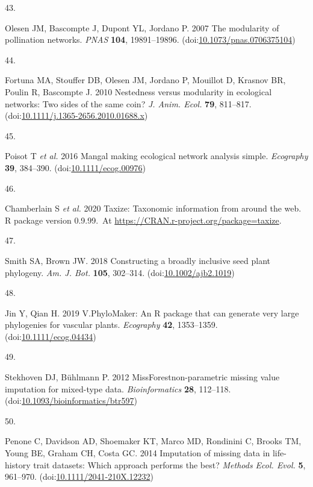 \documentclass[
  12pt,
  a4paper,
]{article}
\newlength{\cslhangindent}
\newlength{\csllabelwidth}
\newlength{\cslentryspacingunit} %
\newenvironment{CSLReferences}[2] %
 {%
  \setlength{\parindent}{0pt}
  \ifodd #1
  \let\oldpar\par
  \def\par{\hangindent=\cslhangindent\oldpar}
  \fi
  \setlength{\parskip}{#2\cslentryspacingunit}
 }%
 {}
\newcommand{\CSLLeftMargin}[1]{\parbox[t]{\csllabelwidth}{#1}}
\newcommand{\CSLRightInline}[1]{\parbox[t]{\linewidth - \csllabelwidth}{#1}\break}
\begin{document}
\begin{CSLReferences}{0}{0}
\leavevmode{}%
\CSLLeftMargin{43. }
\CSLRightInline{Olesen JM, Bascompte J, Dupont YL, Jordano P. 2007 The modularity of pollination networks. \emph{PNAS} \textbf{104}, 19891--19896. (doi:\href{https://doi.org/10.1073/pnas.0706375104}{10.1073/pnas.0706375104})}

\leavevmode{}%
\CSLLeftMargin{44. }
\CSLRightInline{Fortuna MA, Stouffer DB, Olesen JM, Jordano P, Mouillot D, Krasnov BR, Poulin R, Bascompte J. 2010 Nestedness versus modularity in ecological networks: Two sides of the same coin? \emph{J. Anim. Ecol.} \textbf{79}, 811--817. (doi:\href{https://doi.org/10.1111/j.1365-2656.2010.01688.x}{10.1111/j.1365-2656.2010.01688.x})}

\leavevmode{}%
\CSLLeftMargin{45. }
\CSLRightInline{Poisot T \emph{et al.} 2016 Mangal \textendash{} making ecological network analysis simple. \emph{Ecography} \textbf{39}, 384--390. (doi:\href{https://doi.org/10.1111/ecog.00976}{10.1111/ecog.00976})}

\leavevmode{}%
\CSLLeftMargin{46. }
\CSLRightInline{Chamberlain S \emph{et al.} 2020 Taxize: {Taxonomic} information from around the web. R package version 0.9.99.~At \href{https://CRAN.R-project.org/package=taxize}{https://CRAN.r-project.org/package=taxize}. }

\leavevmode{}%
\CSLLeftMargin{47. }
\CSLRightInline{Smith SA, Brown JW. 2018 Constructing a broadly inclusive seed plant phylogeny. \emph{Am. J. Bot.} \textbf{105}, 302--314. (doi:\href{https://doi.org/10.1002/ajb2.1019}{10.1002/ajb2.1019})}

\leavevmode{}%
\CSLLeftMargin{48. }
\CSLRightInline{Jin Y, Qian H. 2019 V.{PhyloMaker}: An {R} package that can generate very large phylogenies for vascular plants. \emph{Ecography} \textbf{42}, 1353--1359. (doi:\href{https://doi.org/10.1111/ecog.04434}{10.1111/ecog.04434})}

\leavevmode{}%
\CSLLeftMargin{49. }
\CSLRightInline{Stekhoven DJ, Bühlmann P. 2012 {MissForest}\textemdash non-parametric missing value imputation for mixed-type data. \emph{Bioinformatics} \textbf{28}, 112--118. (doi:\href{https://doi.org/10.1093/bioinformatics/btr597}{10.1093/bioinformatics/btr597})}

\leavevmode{}%
\CSLLeftMargin{50. }
\CSLRightInline{Penone C, Davidson AD, Shoemaker KT, Marco MD, Rondinini C, Brooks TM, Young BE, Graham CH, Costa GC. 2014 Imputation of missing data in life-history trait datasets: Which approach performs the best? \emph{Methods Ecol. Evol.} \textbf{5}, 961--970. (doi:\href{https://doi.org/10.1111/2041-210X.12232}{10.1111/2041-210X.12232})}


\end{CSLReferences}
\end{document}
